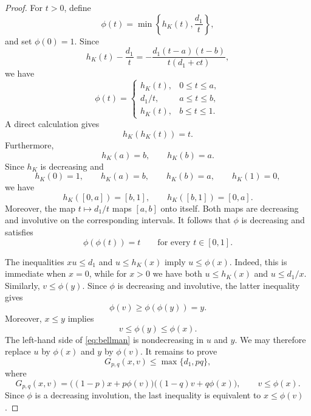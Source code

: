 \documentclass[10pt,a4paper]{amsart}
\begin{document}
\begin{proof}
For $t>0$, define
\begin{equation*}
 \phi(t)=\min\left\{h_K(t),\frac{d_1}{t}\right\},
\end{equation*}
and set $\phi(0)=1$. Since
\begin{equation*}
 h_K(t)-\frac{d_1}{t}
 =
 -\frac{d_1(t-a)(t-b)}
        {t(d_1+ct)},
\end{equation*}
we have
\begin{equation}
 \phi(t)=
 \begin{cases}
  h_K(t),&0\leq t\leq a,\\[2pt]
  d_1/t,&a\leq t\leq b,\\[2pt]
  h_K(t),&b\leq t\leq1.
 \end{cases}
 \label{eq:phi-pieces}
\end{equation}
A direct calculation gives
\begin{equation*}
 h_K(h_K(t))=t.
\end{equation*}
Furthermore,
\begin{equation*}
 h_K(a)=b,
 \qquad
 h_K(b)=a.
\end{equation*}
Since $h_K$ is decreasing and
\begin{equation*}
 h_K(0)=1,
 \qquad
 h_K(a)=b,
 \qquad
 h_K(b)=a,
 \qquad
 h_K(1)=0,
\end{equation*}
we have
\begin{equation*}
 h_K([0,a])=[b,1],
 \qquad
 h_K([b,1])=[0,a].
\end{equation*}
Moreover, the map $t\mapsto d_1/t$ maps $[a,b]$ onto itself. Both maps are decreasing
and involutive on the corresponding intervals. It follows that
$\phi$ is decreasing and satisfies
\begin{equation*}
 \phi(\phi(t))=t
 \qquad\text{for every }t\in[0,1].
\end{equation*}

The inequalities $xu\leq d_1$ and $u\leq h_K(x)$ imply
$
 u\leq\phi(x).
$
Indeed, this is immediate when $x=0$, while for $x>0$ we have both
$u\leq h_K(x)$ and $u\leq d_1/x$. Similarly,
$
 v\leq\phi(y).
$
Since $\phi$ is decreasing and involutive, the latter inequality gives
\begin{equation*}
 \phi(v)\geq\phi(\phi(y))=y.
\end{equation*}
Moreover, $x\leq y$ implies
\begin{equation*}
 v\leq\phi(y)\leq\phi(x).
\end{equation*}
The left-hand side of \eqref{eq:bellman} is nondecreasing in $u$ and
$y$. We may therefore replace $u$ by $\phi(x)$ and $y$ by $\phi(v)$.
It remains to prove
\begin{equation*}
 G_{p,q}(x,v)\leq\max\{d_1,pq\},
\end{equation*}
where
\begin{equation*}
 G_{p,q}(x,v)
 =
 \bigl((1-p)x+p\phi(v)\bigr)
 \bigl((1-q)v+q\phi(x)\bigr),\qquad v\leq\phi(x).
\end{equation*}
Since $\phi$ is a decreasing involution, the last inequality is
equivalent to $x\leq\phi(v)$.



\end{proof}
\end{document}
